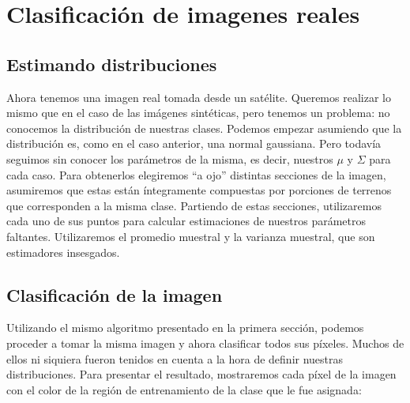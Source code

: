 \section{Clasificación de imagenes reales}
\subsection{Estimando distribuciones}
Ahora tenemos una imagen real tomada desde un satélite. Queremos realizar lo mismo que en el caso de las imágenes sintéticas, pero tenemos un problema: no conocemos la distribución de nuestras clases. Podemos empezar asumiendo que la distribución es, como en el caso anterior, una normal gaussiana. Pero todavía seguimos sin conocer los parámetros de la misma, es decir, nuestros $\mu$ y $\Sigma$ para cada caso. Para obtenerlos elegiremos ``a ojo'' distintas secciones de la imagen, asumiremos que estas están íntegramente compuestas por porciones de terrenos que corresponden a la misma clase. Partiendo de estas secciones, utilizaremos cada uno de sus puntos para calcular estimaciones de nuestros parámetros faltantes. Utilizaremos el promedio muestral y la varianza muestral, que son estimadores insesgados.

\subsection{Clasificación de la imagen}
Utilizando el mismo algoritmo presentado en la primera sección, podemos proceder a tomar la misma imagen y ahora clasificar todos sus píxeles. Muchos de ellos ni siquiera fueron tenidos en cuenta a la hora de definir nuestras distribuciones. Para presentar el resultado, mostraremos cada píxel de la imagen con el color de la región de entrenamiento de la clase que le fue asignada:

